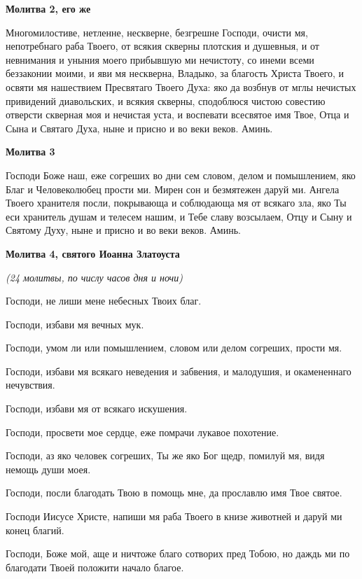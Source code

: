 \medskip


\bfseries Молитва 2, его же\normalfont{}


Многомилостиве, нетленне, нескверне, безгрешне Господи, очисти мя, непотребнаго раба Твоего, от всякия скверны плотския и душевныя, и от невнимания и уныния моего прибывшую ми нечистоту, со инеми всеми беззаконии моими, и яви мя нескверна, Владыко, за благость Христа Твоего, и освяти мя нашествием Пресвятаго Твоего Духа: яко да возбнув от мглы нечистых привидений диавольских, и всякия скверны, сподоблюся чистою совестию отверсти скверная моя и нечистая уста, и воспевати всесвятое имя Твое, Отца и Сына и Святаго Духа, ныне и присно и во веки веков. Аминь.


\medskip


\bfseries Молитва 3\normalfont{}


Господи Боже наш, еже согреших во дни сем словом, делом и помышлением, яко Благ и Человеколюбец прости ми. Мирен сон и безмятежен даруй ми. Ангела Твоего хранителя посли, покрывающа и соблюдающа мя от всякаго зла, яко Ты еси хранитель душам и телесем нашим, и Тебе славу возсылаем, Отцу и Сыну и Святому Духу, ныне и присно и во веки веков. Аминь.


\medskip


\bfseries Молитва 4, святого Иоанна Златоуста\normalfont{}


\itshape (24 молитвы, по числу часов дня и ночи)\normalfont{}

Господи, не лиши мене небесных Твоих благ.

Господи, избави мя вечных мук.

Господи, умом ли или помышлением, словом или делом согреших, прости мя.

Господи, избави мя всякаго неведения и забвения, и малодушия, и окамененнаго нечувствия.

Господи, избави мя от всякаго искушения.

Господи, просвети мое сердце, еже помрачи лукавое похотение.

Господи, аз яко человек согреших, Ты же яко Бог щедр, помилуй мя, видя немощь души моея.

Господи, посли благодать Твою в помощь мне, да прославлю имя Твое святое.

Господи Иисусе Христе, напиши мя раба Твоего в книзе животней и даруй ми конец благий.

Господи, Боже мой, аще и ничтоже благо сотворих пред Тобою, но даждь ми по благодати Твоей положити начало благое.

